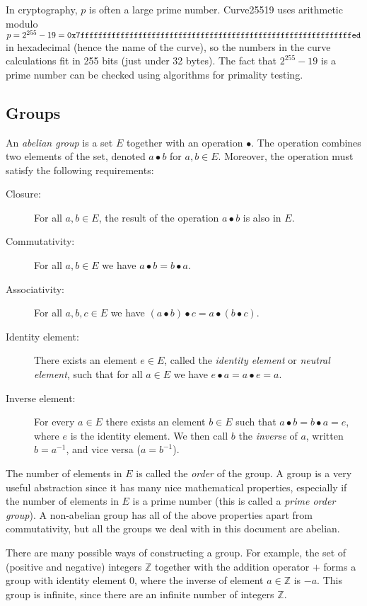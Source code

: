 \documentclass{article}
\begin{document}
In cryptography, $p$ is often a large prime number.
Curve25519 uses arithmetic modulo $p=2^{255}-19=\verb|0x7fffffffffffffffffffffffffffffffffffffffffffffffffffffffffffffed|$ in hexadecimal (hence the name of the curve), so the numbers in the curve calculations fit in 255 bits (just under 32 bytes).
The fact that $2^{255}-19$ is a prime number can be checked using algorithms for primality testing.

\subsection{Groups}\label{sec:groups}

An \emph{abelian group} is a set $E$ together with an operation $\bullet$.
The operation combines two elements of the set, denoted $a \bullet b$ for $a, b \in E$.
Moreover, the operation must satisfy the following requirements:
\begin{description}
\item[Closure:] For all $a, b \in E$, the result of the operation $a \bullet b$ is also in $E$.
\item[Commutativity:] For all $a, b \in E$ we have $a \bullet b = b \bullet a$.
\item[Associativity:] For all $a, b, c \in E$ we have $(a \bullet b) \bullet c = a \bullet (b \bullet c)$.
\item[Identity element:] There exists an element $e \in E$, called the \emph{identity element} or \emph{neutral element}, such that for all $a \in E$ we have $e \bullet a = a \bullet e = a$.
\item[Inverse element:] For every $a \in E$ there exists an element $b \in E$ such that $a \bullet b = b \bullet a = e$, where $e$ is the identity element. We then call $b$ the \emph{inverse} of $a$, written $b = a^{-1}$, and vice versa ($a = b^{-1}$).
\end{description}

The number of elements in $E$ is called the \emph{order} of the group.
A group is a very useful abstraction since it has many nice mathematical properties, especially if the number of elements in $E$ is a prime number (this is called a \emph{prime order group}).
A non-abelian group has all of the above properties apart from commutativity, but all the groups we deal with in this document are abelian.

There are many possible ways of constructing a group.
For example, the set of (positive and negative) integers $\mathbb{Z}$ together with the addition operator $+$ forms a group with identity element $0$, where the inverse of element $a \in \mathbb{Z}$ is $-a$.
This group is infinite, since there are an infinite number of integers $\mathbb{Z}$.
\end{document}
